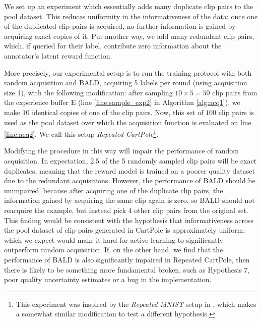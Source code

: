 \documentclass[11pt, a4paper, bibliography=totoc]{report}
\newcommand{\expbuff}{\mathrm{E}}
\begin{document}
We set up an experiment which essentially adds many duplicate clip pairs to the pool dataset. This reduces uniformity in the informativeness of the data: once one of the duplicated clip pairs is acquired, no further information is gained by acquiring exact copies of it. Put another way, we add many redundant clip pairs, which, if queried for their label, contribute zero information about the annotator's latent reward function.

More precisely, our experimental setup is to run the training protocol with both random acquisition and BALD, acquiring 5 labels per round (using acquisition size 1), with the following modification: after sampling $ 10\times 5 = 50 $ clip pairs from the experience buffer $ \expbuff $ (line \ref{line:sample_exp2} in Algorithm \ref{alg:acq1}), we make $ 10 $ identical copies of one of the clip pairs. Now, this set of $ 100 $ clip pairs is used as the pool dataset over which the acquisition function is evaluated on line \ref{line:acq2}. We call this setup \textit{Repeated CartPole}\footnote{This experiment was inspired by the \textit{Repeated MNIST} setup in \cite{Kirsch2019a}, which makes a somewhat similar modification to test a different hypothesis.}.

Modifying the procedure in this way will impair the performance of random acquisition. In expectation, 2.5 of the 5 randomly sampled clip pairs will be exact duplicates, meaning that the reward model is trained on a poorer quality dataset due to the redundant acquisitions. However, the performance of BALD should be unimpaired, because after acquiring one of the duplicate clip pairs, the information gained by acquiring the same clip again is zero, so BALD should not reacquire the example, but instead pick 4 other clip pairs from the original set. This finding would be consistent with the hypothesis that informativeness across the pool dataset of clip pairs generated in CartPole is approximately uniform, which we expect would make it hard for active learning to significantly outperform random acquisition. If, on the other hand, we find that the performance of BALD is also significantly impaired in Repeated CartPole, then there is likely to be something more fundamental broken, such as Hypothesis 7, poor quality uncertainty estimates or a bug in the implementation.
\end{document}
